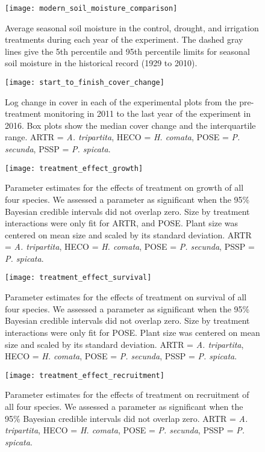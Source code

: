 \documentclass[11pt]{article}
\begin{document}
\begin{figure}[!htbp]
	\centering
	\texttt{[image: modern\_soil\_moisture\_comparison]}
	\caption{Average seasonal soil moisture in the control, drought, and irrigation treatments during each year of the experiment. The dashed gray lines give the 5th percentile and 95th percentile limits for seasonal soil moisture in the historical record (1929 to 2010). }
	\label{fig:seasonalVWC}
\end{figure}


\begin{figure}[!htbp]
	\centering
	\texttt{[image: start\_to\_finish\_cover\_change]}
	\caption{Log change in cover in each of the experimental plots from the pre-treatment monitoring in 2011 to the last year of the experiment in 2016. Box plots show the median cover change and the interquartile range. ARTR = \textit{A. tripartita}, HECO = \textit{H. comata}, POSE = \textit{P. secunda}, PSSP = \textit{P. spicata}.}
	\label{fig:coverChange}
\end{figure}

\begin{figure}[!htbp]
	\centering
	\texttt{[image: treatment\_effect\_growth]}
	\caption{Parameter estimates for the effects of treatment on growth of all four species. We assessed a parameter as significant when the 95\% Bayesian credible intervals did not overlap zero. Size by treatment interactions were only fit for ARTR, and POSE. Plant size was centered on mean size and scaled by its standard deviation. ARTR = \textit{A. tripartita}, HECO = \textit{H. comata}, POSE = \textit{P. secunda}, PSSP = \textit{P. spicata}. }
	\label{fig:growthTreat}
\end{figure}

\begin{figure}[!htbp]
	\centering
	\texttt{[image: treatment\_effect\_survival]}
	\caption{Parameter estimates for the effects of treatment on survival of all four species. We assessed a parameter as significant when the 95\% Bayesian credible intervals did not overlap zero. Size by treatment interactions were only fit for POSE. Plant size was centered on mean size and scaled by its standard deviation.  ARTR = \textit{A. tripartita}, HECO = \textit{H. comata}, POSE = \textit{P. secunda}, PSSP = \textit{P. spicata}. }
	\label{fig:survivalTreat}
\end{figure}

\begin{figure}[!htbp]
	\centering
	\texttt{[image: treatment\_effect\_recruitment]}
	\caption{Parameter estimates for the effects of treatment on recruitment of all four species. We assessed a parameter as significant when the 95\% Bayesian credible intervals did not overlap zero.  ARTR = \textit{A. tripartita}, HECO = \textit{H. comata}, POSE = \textit{P. secunda}, PSSP = \textit{P. spicata}. }
	\label{fig:recruitmentTreat}
\end{figure}
\end{document}
